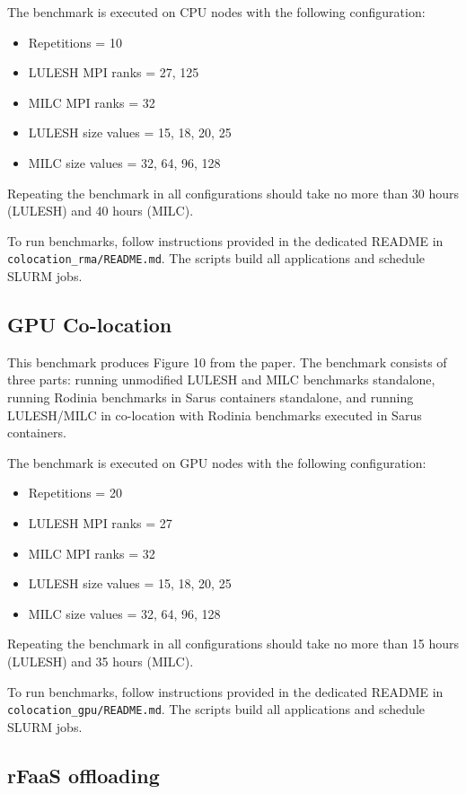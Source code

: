 \documentclass{article}
\begin{document}
The benchmark is executed on CPU nodes with the following configuration:
\begin{itemize}
\item Repetitions = 10
\item LULESH MPI ranks = 27, 125
\item MILC MPI ranks = 32
\item LULESH size values = 15, 18, 20, 25
\item MILC size values = 32, 64, 96, 128
\end{itemize}
Repeating the benchmark in all configurations should take no more than 30 hours (LULESH) and 40 hours (MILC).

To run benchmarks, follow instructions provided in the dedicated README in \texttt{colocation\_rma/README.md}.
The scripts build all applications and schedule SLURM jobs.

\subsection{GPU Co-location}

This benchmark produces Figure 10 from the paper.
The benchmark consists of three parts: running unmodified LULESH and MILC benchmarks standalone,
running Rodinia benchmarks in Sarus containers standalone, and running LULESH/MILC in co-location with
Rodinia benchmarks executed in Sarus containers.

The benchmark is executed on GPU nodes with the following configuration:
\begin{itemize}
\item Repetitions = 20
\item LULESH MPI ranks = 27
\item MILC MPI ranks = 32
\item LULESH size values = 15, 18, 20, 25
\item MILC size values = 32, 64, 96, 128
\end{itemize}
Repeating the benchmark in all configurations should take no more than 15 hours (LULESH) and 35 hours (MILC).

To run benchmarks, follow instructions provided in the dedicated README in \texttt{colocation\_gpu/README.md}.
The scripts build all applications and schedule SLURM jobs.

\subsection{rFaaS offloading}
\end{document}
